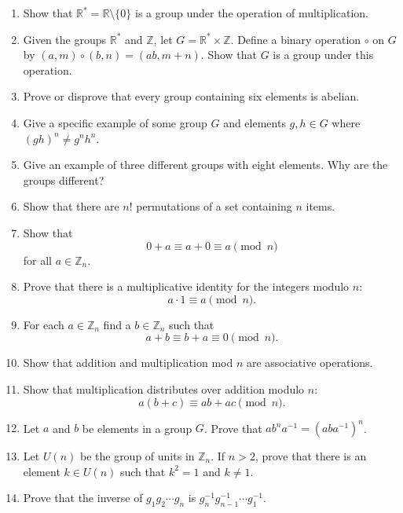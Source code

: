 {\begin{enumerate}
 
\item
Show that ${\mathbb R}^{\ast} = {\mathbb R} \setminus \{0 \}$ is a group
under the operation of multiplication. 
 
 
\item
Given the groups  ${\mathbb R}^{\ast}$ and ${\mathbb Z}$, let $G = {\mathbb
R}^{\ast}  \times {\mathbb Z}$. Define a binary operation $\circ$ on $G$
by $(a,m) \circ (b,n) = (ab, m+n)$. Show that $G$ is a group under
this operation. 
 
 
\item
Prove or disprove that every group containing six elements is abelian.
 
 
\item
Give a specific example of some group $G$ and elements $g, h \in G$
where $(gh)^n \neq g^nh^n$. 
 
 
\item %
Give an example of three different groups with eight elements.  Why
are the groups different? 
 
 
\item
Show that there are $n!$ permutations of a set containing $n$ items. 
 
 
\item
Show that 
$$
0 + a  \equiv a + 0  \equiv a \pmod{ n }
$$
for all $a \in {\mathbb Z}_n$.
 
 
\item
Prove that there is  a multiplicative identity for the integers modulo
$n$: 
$$
a \cdot  1   \equiv  a \pmod{ n}.
$$
 
 
\item
For each $a \in {\mathbb Z}_n$ find a $b \in {\mathbb Z}_n$ such that
$$
a+b \equiv b+a  \equiv 0 \pmod{ n}.
$$
 
 
\item
Show that addition and multiplication mod $n$ are associative
operations. 
 
 
\item
Show that multiplication distributes over addition modulo $n$:
$$
a  (b  + c)  \equiv a  b + a  c  \pmod{ n}.
$$
 
 
\item
Let $a$ and $b$ be elements in a group $G$.  Prove that $ab^na^{-1} =
(aba^{-1})^n$. 
 
 
\item
Let $U(n)$ be the group of units in ${\mathbb Z}_n$. If $n>2$, prove that
there is an element $k \in U(n)$ such that $k^2 = 1$ and $k \neq 1$.
 
 
\item
Prove that the inverse of $g _1 g_2 \cdots g_n$ is $g_n^{-1}
g_{n-1}^{-1} \cdots g_1^{-1}$. 
 

\end{enumerate}}

